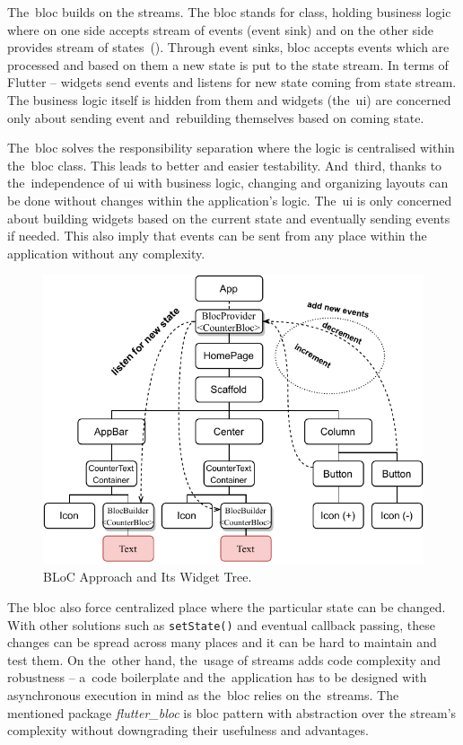 The~\gls{bloc} builds on the streams. The \gls{bloc} stands for class, holding business logic where on one side accepts stream of events (event sink) and on the other side provides stream of states~(). Through event sinks, \gls{bloc} accepts events which are processed and based on them a new state is put to the state stream. In terms of Flutter -- widgets send events and listens for new state coming from state stream. The business logic itself is hidden from them and widgets (the~\gls{ui}) are concerned only about sending event and~rebuilding themselves based on coming state.

The~\gls{bloc} solves the responsibility separation where the logic is centralised within the~\gls{bloc} class. This leads to better and easier testability. And~third, thanks to the~independence of \gls{ui} with business logic, changing and organizing layouts can be done without changes within the application's logic. The~\gls{ui} is only concerned about building widgets based on the current state and eventually sending events if needed. This also imply that events can be sent from any place within the application without any complexity.

\begin{figure}[ht]
    \centering
    \includegraphics[width=0.75\linewidth]{img/flutter/counter-bloc.pdf}
    \caption{BLoC Approach and Its Widget Tree.}
    \label{fig:counter-app-bloc}
\end{figure}

The \gls{bloc} also force centralized place where the particular state can be changed. With other solutions such as \verb|setState()| and eventual callback passing, these changes can be spread across many places and it can be hard to maintain and test them. On the~other hand, the~usage of streams adds code complexity and robustness -- a~code boilerplate and the~application has to be designed with asynchronous execution in mind as the~\gls{bloc} relies on the~streams. The mentioned package \textit{flutter\_bloc} is \gls{bloc} pattern with abstraction over the stream's complexity without downgrading their usefulness and advantages. 

